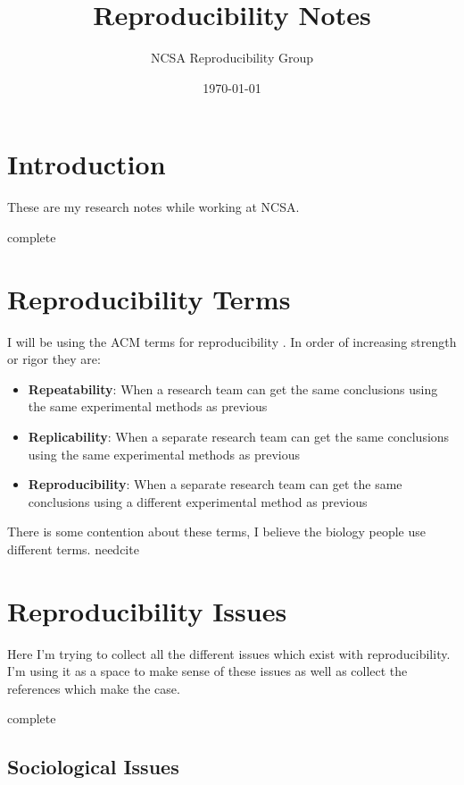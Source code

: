 \documentclass[american]{article}
\title{Reproducibility Notes}
\author{NCSA Reproducibility Group}
\date{\today}
\newcommand{\complete}{
	\gls{complete}
}
\newcommand{\needcite}{
	\gls{needcite}
}
\begin{document}
\maketitle

\tableofcontents

\section{Introduction}

These are my research notes while working at NCSA.

\complete

\section{Reproducibility Terms}

I will be using the ACM terms for reproducibility \cite{acm-badging}. In order of increasing strength or rigor they are:

\begin{itemize}
\item \textbf{Repeatability}: When a research team can get the same conclusions using the same experimental methods as previous
\item \textbf{Replicability}: When a separate research team can get the same conclusions using the same experimental methods as previous
\item \textbf{Reproducibility}: When a separate research team can get the same conclusions using a different experimental method as previous
\end{itemize}

There is some contention about these terms, I believe the biology people use different terms. \needcite

\section{Reproducibility Issues}

Here I'm trying to collect all the different issues which exist with reproducibility. I'm using it as a space to make sense of these issues as well as collect the references which make the case.

\complete

\subsection{Sociological Issues}
\end{document}
